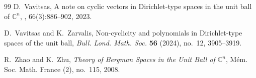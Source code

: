 \documentclass[a4paper,12pt]{amsart}
\theoremstyle{definition}
\theoremstyle{remark}
\begin{document}
\begin{thebibliography}{99}
D.~Vavitsas,
\newblock A note on cyclic vectors in Dirichlet-type spaces in the unit ball of $\mathbb{C}^n$,
, 66(3):886–902, 2023.


D.~Vavitsas and K.~Zarvalis,
\newblock Non-cyclicity and polynomials in {Dirichlet}-type spaces of the unit ball,
\newblock \emph{Bull. Lond. Math. Soc.} \textbf{56} (2024), no.~12, 3905--3919.

R.~Zhao and K.~Zhu,
\newblock \emph{Theory of {Bergman} Spaces in the Unit Ball of $\mathbb{C}^n$},
\newblock Mém. Soc. Math. France (2), no.~115, 2008.

\end{thebibliography}





		
\end{document}
